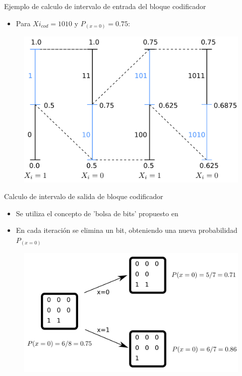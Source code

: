 \documentclass[xcolor=table]{beamer}
\begin{document}
\begin{frame}{Ejemplo de calculo de intervalo de entrada del bloque codificador}
\begin{itemize}
    \item Para $Xi_{cod} = 1010$ y $P_{(x=0)}=0.75$: 
\end{itemize}
\begin{figure}[H]
  \centering
  \includegraphics[width=0.80\paperheight]{Diagramas/int_ent_cod.png}%
   \end{figure}
\end{frame}

\begin{frame}{Calculo de intervalo de salida de bloque codificador}
\begin{itemize}
    \item Se utiliza el concepto de 'bolsa de bits' propuesto en \cite[Sec.\ 4]{schulte}
    \item En cada iteración se elimina un bit, obteniendo una nueva probabilidad $P_{(x=0)}$ 
\end{itemize}
\begin{figure}[H]
  \centering
  \includegraphics[width=0.70\paperwidth]{Diagramas/bag.png}%
   \end{figure}
\end{frame}
\end{document}
